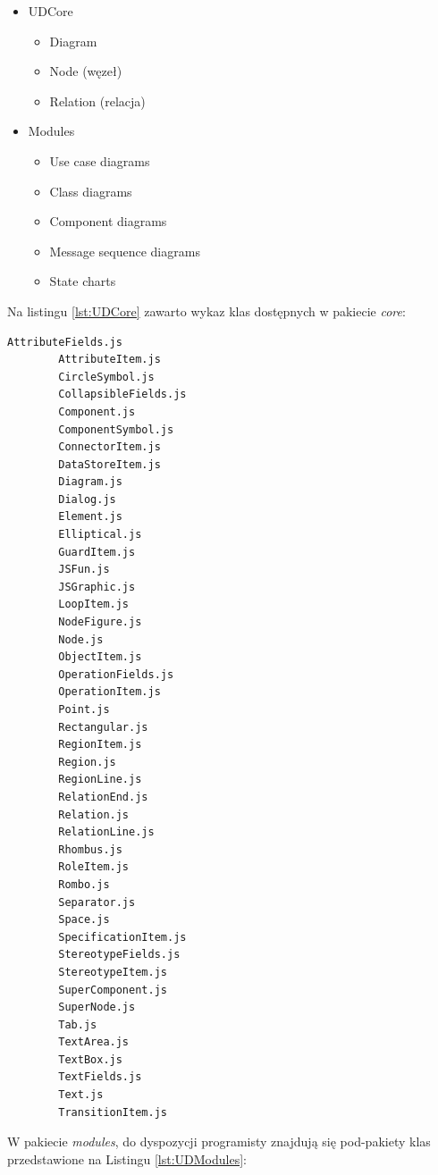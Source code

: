         \begin{itemize}
          \item UDCore
            \begin{itemize}
              \item Diagram
              \item Node (węzeł)
              \item Relation (relacja)
            \end{itemize}
          \item Modules 
            \begin{itemize}
              \item Use case diagrams
              \item Class diagrams
              \item Component diagrams
              \item Message sequence diagrams
              \item State charts
            \end{itemize}
        \end{itemize}

        Na listingu \ref{lst:UDCore} zawarto wykaz klas dostępnych w pakiecie \emph{core}:

        \begin{lstlisting}[caption={Klasy bazowe jsUML2}, label={lst:UDCore}]
        AttributeFields.js
        AttributeItem.js
        CircleSymbol.js
        CollapsibleFields.js
        Component.js
        ComponentSymbol.js
        ConnectorItem.js
        DataStoreItem.js
        Diagram.js
        Dialog.js
        Element.js
        Elliptical.js
        GuardItem.js
        JSFun.js
        JSGraphic.js
        LoopItem.js
        NodeFigure.js
        Node.js
        ObjectItem.js
        OperationFields.js
        OperationItem.js
        Point.js
        Rectangular.js
        RegionItem.js
        Region.js
        RegionLine.js
        RelationEnd.js
        Relation.js
        RelationLine.js
        Rhombus.js
        RoleItem.js
        Rombo.js
        Separator.js
        Space.js
        SpecificationItem.js
        StereotypeFields.js
        StereotypeItem.js
        SuperComponent.js
        SuperNode.js
        Tab.js
        TextArea.js
        TextBox.js
        TextFields.js
        Text.js
        TransitionItem.js
        \end{lstlisting}

        W pakiecie \emph{modules}, do dyspozycji programisty znajdują się pod-pakiety klas przedstawione na Listingu \ref{lst:UDModules}:

